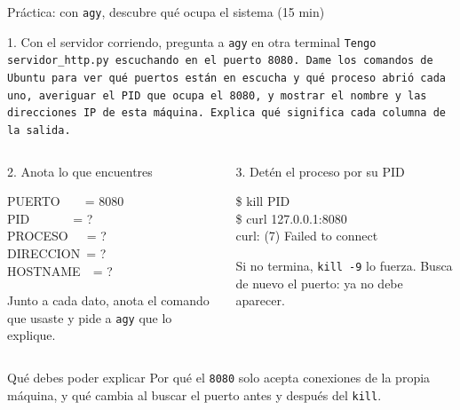 \documentclass[aspectratio=169,10pt,c]{beamer}
\begin{document}
\begin{frame}{Práctica: con \texttt{agy}, descubre qué ocupa el sistema \textnormal{\small(15 min)}}
\begin{block}{1. Con el servidor corriendo, pregunta a \texttt{agy} en otra terminal}
\scriptsize\texttt{Tengo servidor\_http.py escuchando en el puerto 8080. Dame los comandos de Ubuntu para ver qué puertos están en escucha y qué proceso abrió cada uno, averiguar el PID que ocupa el 8080, y mostrar el nombre y las direcciones IP de esta máquina. Explica qué significa cada columna de la salida.}
\end{block}
\begin{columns}[T,onlytextwidth]
\begin{exampleblock}{2. Anota lo que encuentres}
\begin{terminal}\scriptsize
PUERTO~~~~= 8080\\
PID~~~~~~~= \lbrack ? \rbrack\\
PROCESO~~~= \lbrack ? \rbrack\\
DIRECCION~= \lbrack ? \rbrack\\
HOSTNAME~~= \lbrack ? \rbrack
\end{terminal}
\small Junto a cada dato, anota el comando que usaste y pide a \texttt{agy} que lo explique.
\end{exampleblock}
\begin{exampleblock}{3. Detén el proceso por su PID}
\begin{terminal}\scriptsize
\$ kill \lbrack PID \rbrack\\
\$ curl 127.0.0.1:8080\\
curl: (7) Failed to connect
\end{terminal}
\small Si no termina, \texttt{kill -9} lo fuerza. Busca de nuevo el puerto: ya no debe aparecer.
\end{exampleblock}
\end{columns}
\begin{block}{Qué debes poder explicar}
\footnotesize Por qué el \texttt{8080} solo acepta conexiones de la propia máquina, y qué cambia al buscar el puerto antes y después del \texttt{kill}.
\end{block}
\end{frame}
\end{document}
